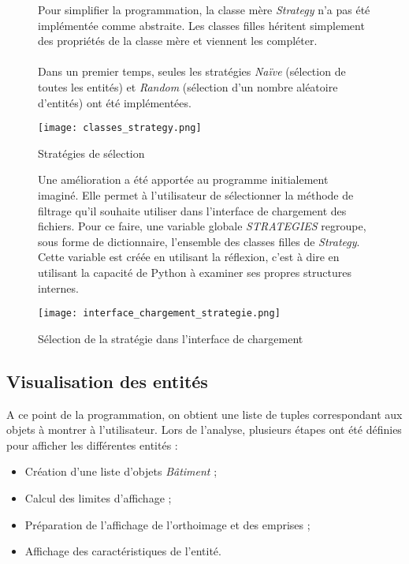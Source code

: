 \begin{figure}[!h]
	\begin{minipage}{0.50\linewidth}\parindent12pt
		\indent Pour simplifier la programmation, la classe mère \textit{Strategy} n'a pas été implémentée comme abstraite. Les classes filles héritent simplement des propriétés de la classe mère et viennent les compléter. \\\\
		\indent Dans un premier temps, seules les stratégies \textit{Naïve} (sélection de toutes les entités) et \textit{Random} (sélection d'un nombre aléatoire d'entités) ont été implémentées.
	\end{minipage}
	\hfill
	\begin{minipage}{0.45\linewidth}
		\centering
		\texttt{[image: classes\_strategy.png]}  \\
		\caption[Stratégies de sélection]{Stratégies de sélection}
		\label{fig:fonctionfiltre}
	\end{minipage}
\end{figure}

\begin{figure}[!h]
	\begin{minipage}{0.50\linewidth}\parindent12pt
		\indent  Une amélioration a été apportée au programme initialement imaginé. Elle permet à l'utilisateur de sélectionner la méthode de filtrage qu'il souhaite utiliser dans l'interface de chargement des fichiers. Pour ce faire, une variable globale \textit{STRATEGIES} regroupe, sous forme de dictionnaire, l'ensemble des classes filles de \textit{Strategy}. Cette variable est créée en utilisant la réflexion, c'est à dire en utilisant la capacité de Python à examiner ses propres structures internes.
	\end{minipage}
	\hfill
	\begin{minipage}{0.45\linewidth}
		\centering
		\texttt{[image: interface\_chargement\_strategie.png]}  \\
		\caption[Sélection de la stratégie dans l'interface de chargement]{Sélection de la stratégie dans l'interface de chargement}
		\label{fig:interfchargement}
	\end{minipage}
\end{figure}

\subsection{Visualisation des entités}

A ce point de la programmation, on obtient une liste de tuples correspondant aux objets à montrer à l'utilisateur. Lors de l'analyse, plusieurs étapes ont été définies pour afficher les différentes entités :
\begin{itemize}[label=$\rightarrow$]
	\item Création d'une liste d'objets \textit{Bâtiment} ;
	\item Calcul des limites d'affichage ;
	\item Préparation de l'affichage de l'orthoimage et des emprises ;
	\item Affichage des caractéristiques de l'entité.\\
\end{itemize}

